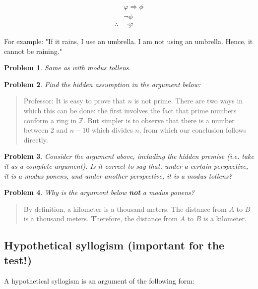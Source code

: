 \documentclass[a4paper, 12pt]{article}
\newtheorem{problem}{Problem}
\newtheorem{problem}{Problem}
\begin{document}
\begin{align*}
    &\varphi \Rightarrow \phi \\ 
    &\neg \phi \\ 
    \therefore &\neg \varphi
\end{align*}

For example: "If it rains, I use an umbrella. I am not using an umbrella. Hence, it cannot be raining."

\begin{problem}
    Same as with modus tollens.
\end{problem}

\begin{problem}
    Find the hidden assumption in the argument below:
\end{problem}

\begin{quote}
    Professor: It is easy to prove that $n$ is not prime. There are two ways in which this can 
    be done: the first involves the fact that prime numbers conform a ring in $\mathbb{Z}$. But 
    simpler is to observe that there is a number between $2$ and $n - 10$ which divides $n$, 
    from which our conclusion follows directly. 
\end{quote}

\begin{problem}
    Consider the argument above, including the hidden premise (i.e. take it as a complete argument). 
    Is it correct to say that, under a certain perspective, it is a modus ponens, and under another 
    perspective, it is a modus tollens? 
\end{problem}

\begin{problem}
    Why is the argument below \textbf{not} a modus ponens?
\end{problem}

\begin{quote}
    By definition, a kilometer is a thousand meters. The distance from $A$ to $B$ is 
    a thousand meters. Therefore, the distance from $A$ to $B$ is a kilometer.
\end{quote}

\subsection{Hypothetical syllogism (important for the test!)}

A hypothetical syllogism is an argument of the following form: 
\end{document}
